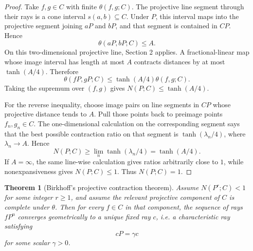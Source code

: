 \documentclass[11pt]{article}
\newtheorem{theorem}{Theorem}
\begin{document}
\begin{proof}
Take \(f,g\in C\) with finite \(\theta(f,g;C)\).  The projective line segment through their rays is a cone interval \(s(a,b)\subseteq C\).  Under \(P\), this interval maps into the projective segment joining \(aP\) and \(bP\), and that segment is contained in \(CP\).  Hence
\[
  \theta(aP,bP;C)\le A.
\]
On this two-dimensional projective line, Section 2 applies.  A fractional-linear map whose image interval has length at most \(A\) contracts distances by at most \(\tanh(A/4)\).  Therefore
\[
  \theta(fP,gP;C)
  \le \tanh(A/4)\theta(f,g;C).
\]
Taking the supremum over \((f,g)\) gives \(N(P;C)\le \tanh(A/4)\).

For the reverse inequality, choose image pairs on line segments in \(CP\) whose projective distance tends to \(A\).  Pull those points back to preimage points \(f_n,g_n\in C\).  The one-dimensional calculation on the corresponding segment says that the best possible contraction ratio on that segment is \(\tanh(\lambda_n/4)\), where \(\lambda_n\to A\).  Hence
\[
  N(P;C)\ge \lim_n \tanh(\lambda_n/4)=\tanh(A/4).
\]
If \(A=\infty\), the same line-wise calculation gives ratios arbitrarily close to \(1\), while nonexpansiveness gives \(N(P;C)\le1\).  Thus \(N(P;C)=1\).
\end{proof}

\begin{theorem}[Birkhoff's projective contraction theorem]
Assume \(N(P^r;C)<1\) for some integer \(r\ge1\), and assume the relevant projective component of \(C\) is complete under \(\theta\).  Then for every \(f\in C\) in that component, the sequence of rays \(fP^n\) converges geometrically to a unique fixed ray \(c\), i.e. a characteristic ray satisfying
\[
  cP=\gamma c
\]
for some scalar \(\gamma>0\).
\end{theorem}
\end{document}
